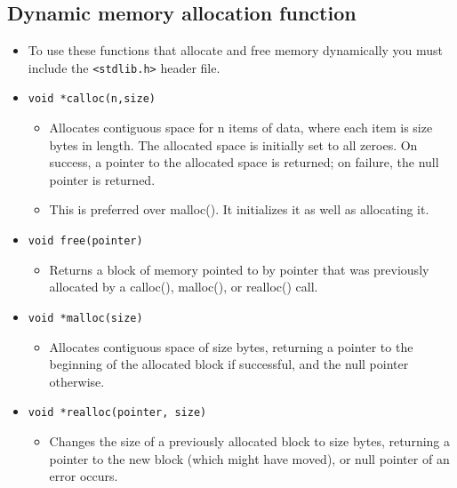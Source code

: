 \subsection{Dynamic memory allocation function}
\begin{itemize}
    \item To use these functions that allocate and free memory dynamically you must include the \verb|<stdlib.h>| header file.
    \item \texttt{void *calloc(n,size)}
        \begin{itemize}
            \item Allocates contiguous space for n items of data, where each item is size bytes in length. The allocated space is initially set to all zeroes. On success, a pointer to the allocated space is returned; on failure, the null pointer is returned. 
            \item This is preferred over malloc(). It initializes it as well as allocating it.
        \end{itemize}
    
    \item \texttt{void free(pointer)}
        \begin{itemize}
            \item Returns a block of memory pointed to by pointer that was previously allocated by a calloc(), malloc(), or realloc() call. 
        \end{itemize}
    
    \item \texttt{void *malloc(size)}
        \begin{itemize}
            \item Allocates contiguous space of size bytes, returning a pointer to the beginning of the allocated block if successful, and the null pointer otherwise.
        \end{itemize}
    
    \item \texttt{void *realloc(pointer, size)}
        \begin{itemize}
            \item Changes the size of a previously allocated block to size bytes, returning a pointer to the new block (which might have moved), or null pointer of an error occurs. 
        \end{itemize}
\end{itemize}


